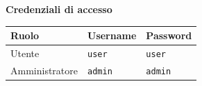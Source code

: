 \documentclass[a4paper, 11pt]{article}
\begin{document}
\begin{titlepage}
\begin{center}
        \textbf{Credenziali di accesso}
        \begin{longtable}{|l|l|l|}
            \hline
            \rowcolor[HTML]{163f77}
            \color{white} \textbf{Ruolo} & \color{white} \textbf{Username} & \color{white} \textbf{Password}\\
            \hline
            Utente & \texttt{user} & \texttt{user}\\
            \hline
            Amministratore & \texttt{admin} & \texttt{admin}\\
            \hline
        \end{longtable}
    \end{center}

\end{titlepage}

\pagebreak

\tableofcontents

\pagebreak










\end{document}

